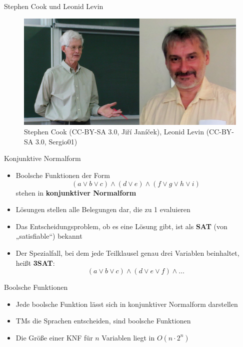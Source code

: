 \documentclass[ignorenonframetext,]{beamer}
\begin{document}
\begin{frame}{Stephen Cook und Leonid Levin}

\begin{figure}[htbp]
\centering
\includegraphics{img/cook_levin.png}
\caption{Stephen Cook (CC-BY-SA 3.0, Jiří Janíček), Leonid Levin
(CC-BY-SA 3.0, Sergio01)}
\end{figure}

\end{frame}

\begin{frame}{Konjunktive Normalform}

\begin{itemize}
\itemsep1pt\parskip0pt
\item
  Boolsche Funktionen der Form
  \[(a \vee b \vee c) \wedge (d \vee e) \wedge (f \vee g \vee h \vee i)\]
  stehen in \textbf{konjunktiver Normalform}
\item
  Lösungen stellen alle Belegungen dar, die zu 1 evaluieren
\item
  Das Entscheidungsproblem, ob es eine Lösung gibt, ist als \textbf{SAT}
  (von „satisfiable``) bekannt
\item
  Der Spezialfall, bei dem jede Teilklausel genau drei Variablen
  beinhaltet, heißt \textbf{3SAT}:
  \[(a \vee b \vee c) \wedge (d \vee e \vee f) \wedge \dots\]
\end{itemize}

\end{frame}

\begin{frame}{Boolsche Funktionen}

\begin{itemize}
\itemsep1pt\parskip0pt
\item
  Jede boolsche Funktion lässt sich in konjunktiver Normalform
  darstellen
\item
  TMs die Sprachen entscheiden, sind boolsche Funktionen
\item
  Die Größe einer KNF für $n$ Variablen liegt in $O(n \cdot 2^n)$
\end{itemize}

\end{frame}
\end{document}
